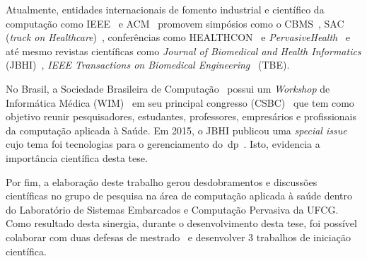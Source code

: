 
Atualmente, entidades internacionais de fomento industrial e científico da computação como IEEE~\cite{ieee2016} e ACM~\cite{acm2016} promovem simpósios como o CBMS~\cite{cbms2016}, SAC (\textit{track on Healthcare})~\cite{sachealth2016}, conferências como HEALTHCON~\cite{healthcon2016} e \textit{PervasiveHealth}~\cite{pervasivehealth2016} e até mesmo revistas científicas como \textit{Journal of Biomedical and Health Informatics} (JBHI)~\cite{jbhi2016}, \textit{IEEE Transactions on Biomedical Engineering}~\cite{tbe2016} (TBE). 

No Brasil, a Sociedade Brasileira de Computação~\cite{sbc2016} possui um \textit{Workshop} de Informática Médica (WIM)~\cite{wim2016} em seu principal congresso (CSBC)~\cite{csbc2016} que tem como objetivo reunir pesquisadores, estudantes, professores, empresários e profissionais da computação aplicada à Saúde. Em 2015, o JBHI publicou uma \textit{special issue} cujo tema foi tecnologias para o gerenciamento do~\ac{dp}~\cite{specjbhi2015}. Isto, evidencia a importância científica desta tese. %

Por fim, a elaboração deste trabalho gerou desdobramentos e discussões científicas no grupo de pesquisa na área de computação aplicada à saúde dentro do Laboratório de Sistemas Embarcados e Computação Pervasiva da UFCG. Como resultado desta sinergia, durante o desenvolvimento desta tese, foi possível colaborar com duas defesas de mestrado~\cite{antonio2013,gustavo2014} e desenvolver 3 trabalhos de iniciação científica. 







